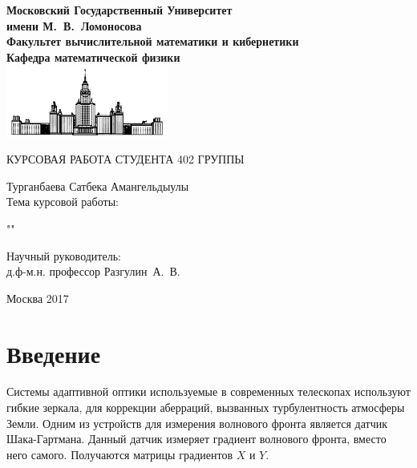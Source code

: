 \documentclass[oneside, final, 14pt]{article}
\begin{document}
\sloppy
	\renewcommand\contentsname{Содержание} %

\begin{titlepage}
\begin{center}
\bfseries
Московский Государственный Университет \\имени М.~В.~Ломоносова\\
Факультет вычислительной математики и кибернетики\\
Кафедра математической физики\\
\includegraphics[width=0.4\textwidth]{msu_logo_small.png}\\
\vfill	

\mdseries
\begin{Large}
КУРСОВАЯ РАБОТА СТУДЕНТА 402 ГРУППЫ\\
\end{Large}
Турганбаева Сатбека Амангельдыулы\\
\vfill	
Тема курсовой работы:\\
\vspace{1cm}
\bfseries
\begin{Large}
""\\
\end{Large}
\vfill	

  \begin{flushright}
        Научный руководитель:\\
        д.ф-м.н. профессор Разгулин~А.~В.
    \end{flushright}

\vfill	


\end{center}

\begin{center}
	Москва 2017
\end{center}

\end{titlepage}

\tableofcontents

\newpage
\section{Введение}
Системы адаптивной оптики используемые в современных телескопах используют гибкие зеркала, для коррекции аберраций, вызванных турбулентность атмосферы Земли. Одним из устройств для измерения волнового фронта является датчик Шака-Гартмана. Данный датчик измеряет градиент волнового фронта, вместо него самого. Получаются матрицы градиентов $X$ и $Y$.
\end{document}

